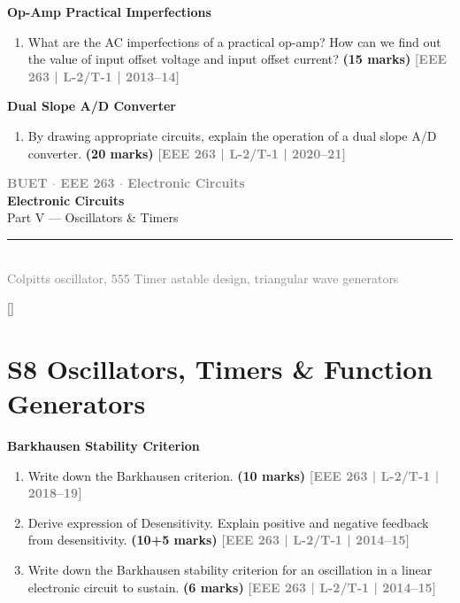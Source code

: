 \documentclass[12pt,a3paper]{article}
\newcommand{\yr}[1]{\hfill\textcolor{gray}{\small\textbf{[#1]}}}
\newcommand{\mk}[1]{\textcolor{orange!70!black}{\small\textbf{(#1 marks)}}}
\newcommand{\subtopic}[2]{%
  \vspace{10pt}
  \noindent\begin{tcolorbox}[colback=#1!8,colframe=#1,boxrule=0.6pt,arc=4pt,
    left=6pt,right=6pt,top=4pt,bottom=4pt]
    \small\bfseries\textcolor{#1}{#2}
  \end{tcolorbox}
  \vspace{2pt}
}
\newcommand{\secdivider}[3]{%
  \newpage\thispagestyle{empty}%
  \vspace*{\fill}%
  \begin{tcolorbox}[enhanced,colback=#3!6,colframe=#3,boxrule=1.5pt,arc=8pt,
    left=20pt,right=20pt,top=22pt,bottom=22pt,
    shadow={3pt}{-3pt}{0pt}{black!15}]
    \centering
    {\large\textcolor{gray}{\textbf{BUET $\cdot$ EEE 263 $\cdot$ Electronic Circuits}}}\\[8pt]
    {\fontsize{26}{32}\selectfont\bfseries\textcolor{#3}{Electronic Circuits}}\\[6pt]
    {\fontsize{15}{19}\selectfont\textcolor{dgray}{#1}}\\[12pt]
    \textcolor{#3!60}{\rule{0.5\textwidth}{0.5pt}}\\[6pt]
    {\small\textcolor{gray}{#2}}
  \end{tcolorbox}%
  \vspace*{\fill}\newpage%
}
\begin{document}
\subtopic{cE}{Op-Amp Practical Imperfections}
\label{sub:s7-imperfections}

\begin{enumerate}\item What are the AC imperfections of a practical op-amp? How can we find out the value of input offset voltage and input offset current?
\mk{15} \yr{EEE 263 | L-2/T-1 | 2013--14}

\end{enumerate}

\subtopic{cE}{Dual Slope A/D Converter}
\label{sub:s7-adc}

\begin{enumerate}\item By drawing appropriate circuits, explain the operation of a dual slope A/D converter.
\mk{20} \yr{EEE 263 | L-2/T-1 | 2020--21}

\end{enumerate}


\secdivider{Part V --- Oscillators \& Timers}{Colpitts oscillator, 555 Timer astable design, triangular wave generators}{cF}

\label{sec:S8}
\titleformat{\section}{\large\bfseries\color{cF}}{}{0em}{}[\titlerule]
\section*{S8 \quad Oscillators, Timers \& Function Generators}

\subtopic{cF}{Barkhausen Stability Criterion}
\label{sub:s8-barkhausen}

\begin{enumerate}\item Write down the Barkhausen criterion.
\mk{10} \yr{EEE 263 | L-2/T-1 | 2018--19}

\item Derive expression of Desensitivity. Explain positive and negative feedback from desensitivity.
\mk{10+5} \yr{EEE 263 | L-2/T-1 | 2014--15}


\item Write down the Barkhausen stability criterion for an oscillation in a linear electronic circuit to sustain.
\mk{6} \yr{EEE 263 | L-2/T-1 | 2014--15}

\end{enumerate}
\end{document}
